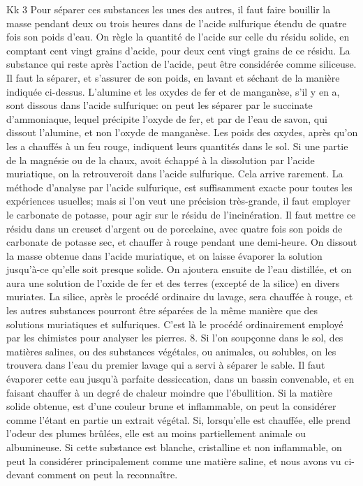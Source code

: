 Kk 3\setcounter{page}{432} Pour séparer ces substances les unes des autres, il faut faire bouillir la masse pendant deux ou trois heures dans de l'acide sulfurique étendu de quatre fois son poids d'eau. On règle la quantité de l'acide sur celle du résidu solide, en comptant cent vingt grains d'acide, pour deux cent vingt grains de ce résidu.
La substance qui reste après l'action de l'acide, peut être considérée comme siliceuse. Il faut la séparer, et s'assurer de son poids, en lavant et séchant de la manière indiquée ci-dessus.
L'alumine et les oxydes de fer et de manganèse, s'il y en a, sont dissous dans l'acide sulfurique: on peut les séparer par le succinate d'ammoniaque, lequel précipite l'oxyde de fer, et par de l'eau de savon, qui dissout l'alumine, et non l'oxyde de manganèse. Les poids des oxydes, après qu'on les a chauffés à un feu rouge, indiquent leurs quantités dans le sol.
Si une partie de la magnésie ou de la chaux, avoit échappé à la dissolution par l'acide muriatique, on la retrouveroit dans l'acide sulfurique. Cela arrive rarement.
La méthode d'analyse par l'acide sulfurique, est suffisamment exacte pour toutes les expériences usuelles; mais si l'on veut une\setcounter{page}{433} précision très-grande, il faut employer le carbonate de potasse, pour agir sur le résidu de l'incinération. Il faut mettre ce résidu dans un creuset d'argent ou de porcelaine, avec quatre fois son poids de carbonate de potasse sec, et chauffer à rouge pendant une demi-heure. On dissout la masse obtenue dans l'acide muriatique, et on laisse évaporer la solution jusqu'à-ce qu'elle soit presque solide. On ajoutera ensuite de l'eau distillée, et on aura une solution de l'oxide de fer et des terres (excepté de la silice) en divers muriates. La silice, après le procédé ordinaire du lavage, sera chauffée à rouge, et les autres substances pourront être séparées de la même manière que des solutions muriatiques et sulfuriques. C'est là le procédé ordinairement employé par les chimistes pour analyser les pierres.
8. Si l'on soupçonne dans le sol, des matières salines, ou des substances végétales, ou animales, ou solubles, on les trouvera dans l'eau du premier lavage qui a servi à séparer le sable. Il faut évaporer cette eau jusqu'à parfaite dessiccation, dans un bassin convenable, et en faisant chauffer à un degré de chaleur moindre que l'ébullition.
Si la matière solide obtenue, est d'une couleur brune et inflammable, on peut la\setcounter{page}{434} considérer comme l'étant en partie un extrait végétal. Si, lorsqu'elle est chauffée, elle prend l'odeur des plumes brûlées, elle est au moins partiellement animale ou albumineuse. Si cette substance est blanche, cristalline et non inflammable, on peut la considérer principalement comme une matière saline, et nous avons vu ci-devant comment on peut la reconnaître.
